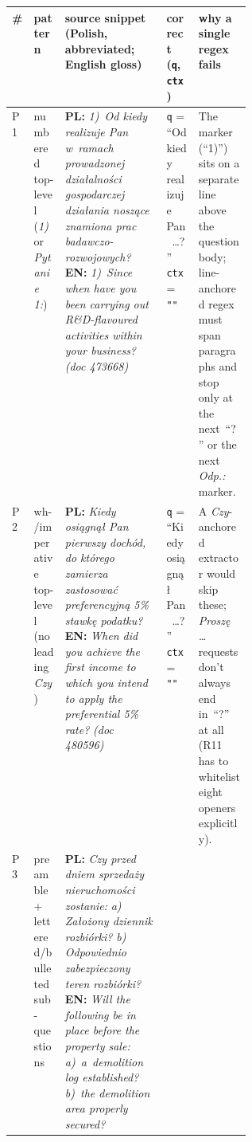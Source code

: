 \begin{table}[!htb]
\centering
\footnotesize
\begin{tabularx}{\linewidth}{@{}lp{0.13\linewidth}XXp{0.22\linewidth}@{}}
\toprule
\textbf{\#} & \textbf{pattern} & \textbf{source snippet (Polish, abbreviated; English gloss)} & \textbf{correct (\texttt{q}, \texttt{ctx})} & \textbf{why a single regex fails} \\
\midrule
P1 & numbered top-level (\textit{1)} or \textit{Pytanie 1:})
   & \textbf{PL:} \textit{1)~Od kiedy realizuje Pan w~ramach prowadzonej działalności gospodarczej działania noszące znamiona prac badawczo-rozwojowych?} \newline
     \textbf{EN:} \textit{1)~Since when have you been carrying out R\&D-flavoured activities within your business?} \newline
     \emph{(doc 473668)}
   & \texttt{q} = ``Od kiedy realizuje Pan~\ldots?'' \newline \texttt{ctx} = \texttt{""}
   & The marker (``1)'') sits on a separate line above the question body; line-anchored regex must span paragraphs and stop only at the next~``?'' or the next \textit{Odp.:}~marker. \\
\addlinespace
P2 & wh-/imperative top-level (no leading \textit{Czy})
   & \textbf{PL:} \textit{Kiedy osiągnął Pan pierwszy dochód, do którego zamierza zastosować preferencyjną 5\% stawkę podatku?} \newline
     \textbf{EN:} \textit{When did you achieve the first income to which you intend to apply the preferential 5\% rate?} \newline
     \emph{(doc 480596)}
   & \texttt{q} = ``Kiedy osiągnął Pan~\ldots?'' \newline \texttt{ctx} = \texttt{""}
   & A \textit{Czy}-anchored extractor would skip these; \textit{Proszę~\ldots} requests don't always end in~``?'' at all (R11 has to whitelist eight openers explicitly). \\
\addlinespace
P3 & preamble + lettered/bulleted sub-questions
   & \textbf{PL:} \textit{Czy przed dniem sprzedaży nieruchomości zostanie:} \newline
     \quad\textit{a) Założony dziennik rozbiórki?} \newline
     \quad\textit{b) Odpowiednio zabezpieczony teren rozbiórki?} \newline
     \textbf{EN:} \textit{Will the following be in place before the property sale: a)~a~demolition log established?  b)~the demolition area properly secured?} \newline

\end{tabularx}
\end{table}
